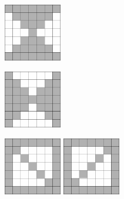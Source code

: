 \begin{enumerate}
\begin{figure}%
\begin{floatrow}[4]
\ffigbox[\FBwidth]
{%
\captionsetup{labelfont=footnotesize}\caption{}%
\label{ch06:refDrawing19}}
{\includegraphics[width=0.225\textwidth,keepaspectratio]{img/ris_6_20}}%

\ffigbox[\FBwidth]
{\caption{}%
\label{ch06:refDrawing20}}
{\includegraphics[width=0.225\textwidth,keepaspectratio]{img/ris_6_21}}%

\ffigbox[\FBwidth]%
{\caption{}%
\label{ch06:refDrawing21}}
{\includegraphics[width=0.225\textwidth,keepaspectratio]{img/ris_6_22}}%
\ffigbox[\FBwidth]%
{\caption{}%
\label{ch06:refDrawing22}}
{\includegraphics[width=0.225\textwidth,keepaspectratio]{img/ris_6_23}}%
\end{floatrow}
\end{figure}%




\end{enumerate}
